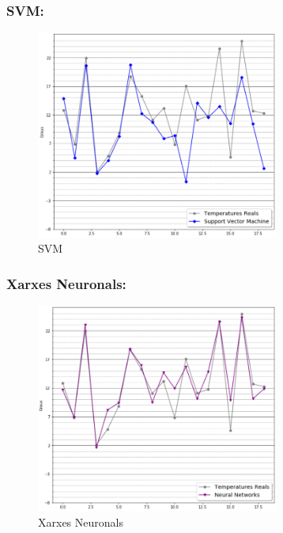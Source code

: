 \documentclass[10pt,a4paper,twocolumn,twoside]{article}
\begin{document}
\subsubsection{SVM:}
\bigskip
\begin{figure}[!th]
\centering
	\includegraphics[width=80mm]{../img/SVMPredict}
	\caption{SVM}
	\label{fig-SVM}
\end{figure}

\subsubsection{Xarxes Neuronals:}

\begin{figure}[!h]
\centering
	\includegraphics[width=80mm]{../img/XarxesNeurPredict}
	\caption{Xarxes Neuronals}
	\label{fig-NN}
\end{figure}
\end{document}
